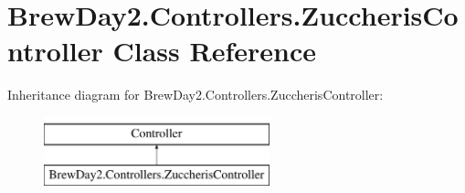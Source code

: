 \hypertarget{class_brew_day2_1_1_controllers_1_1_zuccheris_controller}{}\section{Brew\+Day2.\+Controllers.\+Zuccheris\+Controller Class Reference}
\label{class_brew_day2_1_1_controllers_1_1_zuccheris_controller}
Inheritance diagram for Brew\+Day2.\+Controllers.\+Zuccheris\+Controller\+:\begin{figure}[H]
\begin{center}
\leavevmode
\includegraphics[height=2.000000cm]{class_brew_day2_1_1_controllers_1_1_zuccheris_controller}
\end{center}
\end{figure}
